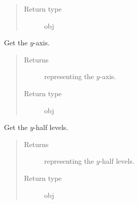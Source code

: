 \documentclass[letterpaper,10pt,english]{sphinxmanual}
\begin{document}
\begin{fulllineitems}
\begin{fulllineitems}
\begin{quote}
\begin{description}
\item[{Return type}] \leavevmode
obj

\end{description}\end{quote}

\end{fulllineitems}


\begin{fulllineitems}
\label{\detokenize{api:grids.grid_xyz.GridXYZ.y}}
Get the \(y\)-axis.
\begin{quote}\begin{description}
\item[{Returns}] \leavevmode
{\hyperref[\detokenize{api:grids.axis.Axis}]{}} representing the \(y\)-axis.

\item[{Return type}] \leavevmode
obj

\end{description}\end{quote}

\end{fulllineitems}


\begin{fulllineitems}
\label{\detokenize{api:grids.grid_xyz.GridXYZ.y_half_levels}}
Get the \(y\)-half levels.
\begin{quote}\begin{description}
\item[{Returns}] \leavevmode
{\hyperref[\detokenize{api:grids.axis.Axis}]{}} representing the \(y\)-half levels.

\item[{Return type}] \leavevmode
obj

\end{description}\end{quote}

\end{fulllineitems}


\end{fulllineitems}

\end{document}
